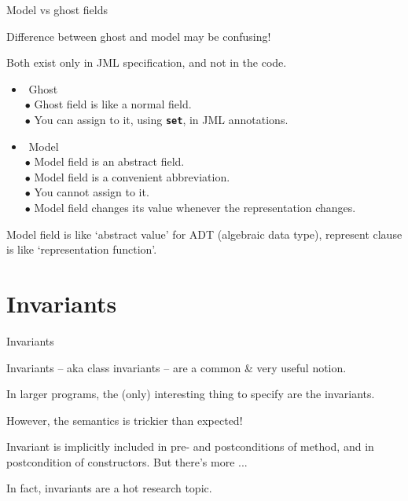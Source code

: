 \documentclass[
pdf,
nocolorBG,
slideColor,
erik,
]{prosper}
\newcommand{\code}[1]{{\rm \texttt{\textbf{\small #1}}}}
\begin{document}
\begin{slide}{Model vs ghost fields}
\vspace*{-4ex}


Difference between {\green ghost} and {\blue model} may be confusing!

Both exist only in JML specification, and not in the code.

\begin{itemize}
\item$\!$ {\green Ghost}\\
$\bullet$ Ghost field is like a normal field. \\
$\bullet$ You can assign to it, using \code{set}, in JML annotations.
\item$\!$ {\blue Model}\\
$\bullet$ Model field is an abstract field.\\
$\bullet$ Model field is a convenient abbreviation.\\
$\bullet$ You cannot assign to it.\\
$\bullet$ Model field changes
its value whenever the representation changes.
\end{itemize}

{\scriptsize Model field is like `abstract value' for ADT (algebraic data type),
represent clause is like `representation function'.}

\end{slide}


\part{{\Large \red Invariants}}

\begin{slide}{Invariants}
\vspace*{-4ex}

Invariants -- aka class invariants -- are a common \& very useful notion.

\medskip

In larger programs, the (only) interesting thing to specify are the invariants.

\medskip

However, the semantics is trickier than expected!

\medskip

Invariant is implicitly included in pre- and postconditions
of method, and in postcondition of constructors.
But there's more ...

\medskip

In fact, invariants are a hot research topic.

\end{slide}
\end{document}
